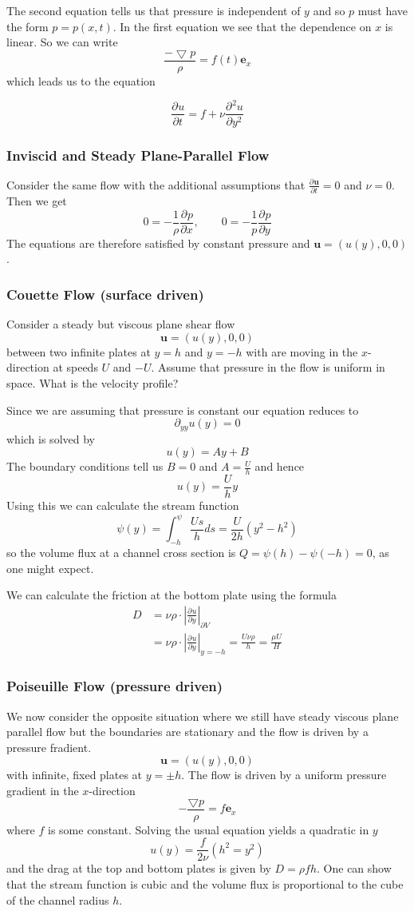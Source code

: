 \documentclass[11pt]{article}
\newcommand*{\pd}[3][]{\ensuremath{\frac{\partial^{#1} {#2}}{\partial {#3}^{#1}}}}
\newcommand{\grad}{\bigtriangledown}
\newcommand{\mv}[1]{\bm{#1}}
\newcommand{\abs}[1]{\left|#1\right|}
\newenvironment{formula}
	{\begin{mdframed}[backgroundcolor=white, roundcorner=5pt, linewidth=1pt, linecolor=red]}
	{\end{mdframed}}
\begin{document}
The second equation tells us that pressure is independent of $y$ and so $p$ must have the form $p=p(x, t)$.
In the first equation we see that the dependence on $x$ is linear. So we can write
\[
	\frac{-\grad p}{\rho}= f(t) \mv{e}_x
\]
which leads us to the equation
\begin{formula}
	\[
		\pd{u}{t} = f + \nu \pd{^2 u}{y^2}
	\]
\end{formula}

\subsubsection{Inviscid and Steady Plane-Parallel Flow}
Consider the same flow with the additional assumptions that $\pd{\mv{u}}{t}=0$ and $\nu=0$. 
Then we get
\[
	0 = - \frac{1}{\rho}\pd{p}{x}, \quad \quad 0 = -\frac{1}{p}\pd{p}{y}
\]
The equations are therefore satisfied by constant pressure and $\mv{u}=(u(y), 0, 0)$.

\subsubsection{Couette Flow (surface driven)}
Consider a steady but viscous plane shear flow
\[
	\mv{u} = (u(y), 0 ,0)
\]
between two infinite plates at $y=h$ and $y=-h$ with are moving in the $x$-direction at speeds $U$ and $-U$.
Assume that pressure in the flow is uniform in space.
What is the velocity profile?

Since we are assuming that pressure is constant our equation reduces to
\[
	\partial_{yy}u(y)=0
\]
which is solved by
\[
	u(y) = Ay + B
\]
The boundary conditions tell us $B=0$ and $A=\frac{U}{h}$ and hence
\[
	u(y) = \frac{U}{h}y
\]
Using this we can calculate the stream function
\[
	\psi(y) = \int_{-h}^\psi \frac{Us}{h}ds = \frac{U}{2h}(y^2 - h^2)
\]
so the volume flux at a channel cross section is $Q = \psi(h) - \psi(-h) = 0$, as one might expect.

We can calculate the friction at the bottom plate using the formula
\begin{align*}
	D & = \nu\rho\cdot\abs{\pd{u}{y}}_{\partial V} \\
	  & = \nu\rho\cdot\abs{\pd{u}{y}}_{y=-h} = \frac{U\nu\rho}{h}=\frac{\mu U}{H}
\end{align*}

\subsubsection{Poiseuille Flow (pressure driven)}
We now consider the opposite situation where we still have steady viscous plane parallel flow but the boundaries are stationary and the flow is driven by a pressure fradient.
\[
	\mv{u}=(u(y), 0, 0)
\]
with infinite, fixed plates at $y=\pm h$.
The flow is driven by a uniform pressure gradient in the $x$-direction
\[
	-\frac{\grad p}{\rho}=f\mv{e}_x
\]
where $f$ is some constant.
Solving the usual equation yields a quadratic in $y$
\[
	u(y)= \frac{f}{2\nu}(h^2 = y^2)
\]
and the drag at the top and bottom plates is given by $D=\rho f h$.
One can show that the stream function is cubic and the volume flux is proportional to the cube of the channel radius $h$.
\end{document}
